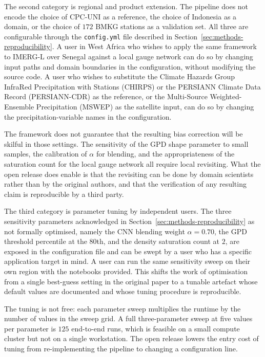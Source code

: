 The second category is regional and product extension. The
pipeline does not encode the choice of CPC-UNI as a reference, the
choice of Indonesia as a domain, or the choice of $172$ BMKG
stations as a validation set. All three are configurable through
the \texttt{config.yml} file described in
Section~\ref{sec:methods-reproducibility}. A user in West Africa
who wishes to apply the same framework to IMERG-L over Senegal
against a local gauge network can do so by changing input paths
and domain boundaries in the configuration, without modifying the
source code. A user who wishes to substitute the Climate Hazards
Group InfraRed Precipitation with Stations (CHIRPS)
\citep{ref:funk2015} or the PERSIANN Climate Data Record
(PERSIANN-CDR) \citep{ref:ashouri2015} as the reference, or the
Multi-Source Weighted-Ensemble Precipitation (MSWEP)
\citep{ref:beck2017} as the satellite
input, can do so by changing the precipitation-variable names in
the configuration.

The framework does not guarantee that the
resulting bias correction will be skilful in those settings. The
sensitivity of the GPD shape parameter to small samples, the
calibration of $\alpha$ for blending, and the appropriateness of
the saturation count for the local gauge network all require
local revisiting. What the open release does enable is that the
revisiting can be done by domain scientists rather than by the
original authors, and that the verification of any resulting
claim is reproducible by a third party.

The third category is parameter tuning by independent users. The
three sensitivity parameters acknowledged in
Section~\ref{sec:methods-reproducibility} as not formally
optimised, namely the CNN blending weight $\alpha = 0.70$, the GPD
threshold percentile at the $80$th, and the density saturation
count at $2$, are exposed in the configuration file and can be
swept by a user who has a specific application target in mind.
A user can run the same sensitivity sweep on their own region
with the notebooks provided. This shifts the work of optimisation
from a
single best-guess setting in the original paper to a tunable
artefact whose default values are documented and whose tuning
procedure is reproducible.

The tuning is not free: each
parameter sweep multiplies the runtime by the number of values
in the sweep grid. A full three-parameter sweep at five values
per parameter is $125$ end-to-end runs, which is feasible on a
small compute cluster but not on a single workstation. The
open release lowers the entry cost of tuning from re-implementing
the pipeline to changing a configuration line.

